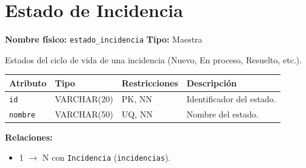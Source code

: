 \documentclass[12pt,a4paper]{article}
\newenvironment{tabladesc}[3]{%
  \section{#1}
  \textbf{Nombre físico:} \texttt{#2} \hfill \textbf{Tipo:} #3\par
  \medskip
}{%
  \bigskip
}
\begin{document}
\begin{tabladesc}{Estado de Incidencia}{estado\_incidencia}{Maestra}

Estados del ciclo de vida de una incidencia (Nuevo, En proceso, Resuelto, etc.).

\bigskip
\begin{longtable}{L{3.5cm} L{2cm} L{1.8cm} L{8cm}}
\toprule
\textbf{Atributo} & \textbf{Tipo} & \textbf{Restricciones} & \textbf{Descripción} \\
\midrule
\endhead
\bottomrule
\endfoot
\texttt{id}     & VARCHAR(20) & PK, NN & Identificador del estado. \\
\texttt{nombre} & VARCHAR(50) & UQ, NN & Nombre del estado. \\
\bottomrule
\end{longtable}

\textbf{Relaciones:}
\begin{itemize}[nosep]
  \item 1 $\rightarrow$ N con \texttt{Incidencia} (\texttt{incidencias}).
\end{itemize}
\end{tabladesc}
\end{document}
